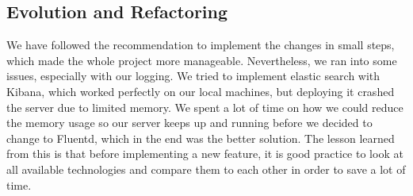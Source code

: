 \subsection{Evolution and Refactoring}

We have followed the recommendation to implement the changes in small steps, which made the whole project more manageable. 
Nevertheless, we ran into some issues, especially with our logging. We tried to implement elastic search with Kibana, which worked perfectly on our local machines, 
but deploying it crashed the server due to limited memory. We spent a lot of time on how we could reduce the memory usage so our server keeps up and running 
before we decided to change to Fluentd, which in the end was the better solution. The lesson learned from this is that before implementing a new feature, 
it is good practice to look at all available technologies and compare them to each other in order to save a lot of time. 
